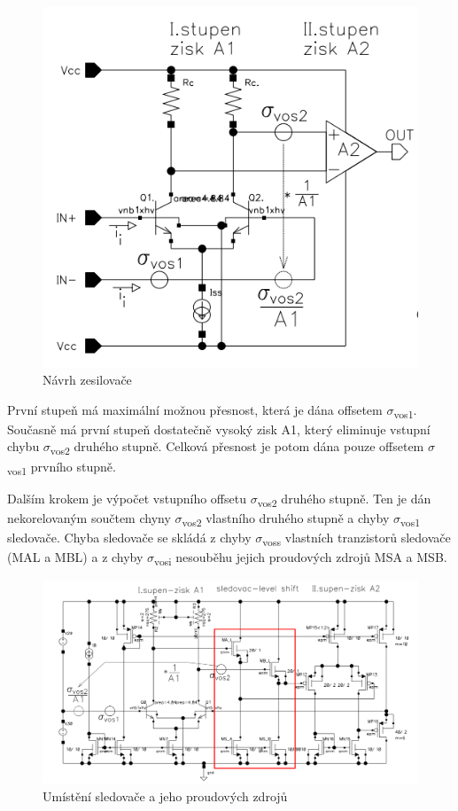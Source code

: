 \begin{figure}[h]
   \begin{center}
     \includegraphics[scale=0.5]{images/OZ.png}
   \end{center}
   \caption{Návrh zesilovače}
\end{figure}

První stupeň má maximální možnou přesnost, která je dána offsetem $\sigma$\textsubscript{vos1}. Současně má první stupeň dostatečně vysoký zisk A1, který eliminuje vstupní chybu $\sigma$\textsubscript{vos2} druhého stupně. Celková přesnost je potom dána pouze offsetem $\sigma$\textsubscript{vos1} prvního stupně.

Dalším krokem je výpočet vstupního offsetu $\sigma$\textsubscript{vos2} druhého stupně. Ten je dán nekorelovaným součtem chyny $\sigma$\textsubscript{vos2} vlastního druhého stupně a chyby $\sigma$\textsubscript{vos1} sledovače. Chyba sledovače se skládá z chyby $\sigma$\textsubscript{voss} vlastních tranzistorů sledovače (MAL a MBL) a z chyby $\sigma$\textsubscript{vosi} nesouběhu jejich proudových zdrojů MSA a MSB.

\begin{figure}[h]
   \begin{center}
     \includegraphics[scale=0.5]{images/sled.png}
   \end{center}
   \caption{Umístění sledovače a jeho proudových zdrojů}
\end{figure}

